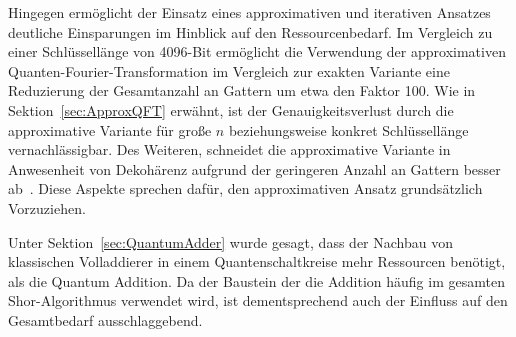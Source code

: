 Hingegen ermöglicht der Einsatz eines approximativen und iterativen Ansatzes deutliche Einsparungen im Hinblick auf den Ressourcenbedarf. 
Im Vergleich zu einer Schlüssellänge von 4096-Bit ermöglicht die Verwendung der approximativen Quanten-Fourier-Transformation im Vergleich zur exakten Variante eine Reduzierung der Gesamtanzahl an Gattern um etwa den Faktor 100.
Wie in Sektion~\ref{sec:ApproxQFT} erwähnt, ist der Genauigkeitsverlust durch die approximative Variante für große \(n\) beziehungsweise konkret Schlüssellänge vernachlässigbar. 
Des Weiteren, schneidet die approximative Variante in Anwesenheit von Dekohärenz aufgrund der geringeren Anzahl an Gattern besser ab~\cite{Barenco_1996}. 
Diese Aspekte sprechen dafür, den approximativen Ansatz grundsätzlich Vorzuziehen.

\vspace{1em}

Unter Sektion~\ref{sec:QuantumAdder} wurde gesagt, 
dass der Nachbau von klassischen Volladdierer in einem Quantenschaltkreise mehr Ressourcen benötigt, 
als die Quantum Addition. 
Da der Baustein der die Addition häufig im gesamten Shor-Algorithmus verwendet wird, 
ist dementsprechend auch der Einfluss auf den Gesamtbedarf ausschlaggebend. 

